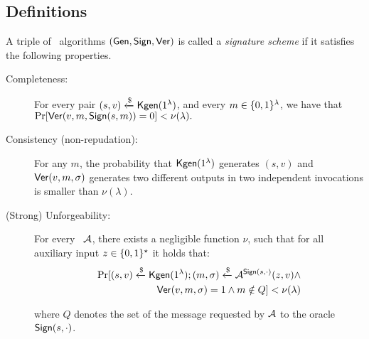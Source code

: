\subsection{Definitions}\label{se:moredefinitions}

\begin{definition}\label{def:signature} A triple of \ppt\ algorithms $(\mathsf{Gen},\mathsf{Sign},\mathsf{Ver})$
is called a {\em signature scheme} if it satisfies the following properties.

\begin{description}

\item[Completeness:] For every pair $(s,v) \xleftarrow{\text{\$}} \mathsf{Kgen}(1^\lambda)$, 
    and every $m \in \{0,1\}^{\lambda}$, we have that $\Pr[\mathsf{Ver}(v, m,\mathsf{Sign}(s, m))=0]<\nu(\lambda).$
\item[Consistency (non-repudation):] For any $m$, the probability that $\mathsf{Kgen}(1^\lambda)$ generates $(s,v)$
and $\mathsf{Ver}(v,m,\sigma)$ generates two different outputs in two independent invocations is smaller than $\nu(\lambda)$.


\item[(Strong) Unforgeability:] For every \ppt\ $\mathcal{A}$, there exists a negligible function $\nu$,  such that for all auxiliary input $z\in \{0,1\}^{\star}$ it holds that:
	\begin{equation*}\begin{split}
\Pr[(s,v) \xleftarrow{\text{\$}} \mathsf{Kgen}(1^\lambda); (m,\sigma)\xleftarrow{\text{\$}}\mathcal{A}^{\mathsf{Sign}(s,\cdot)}(z,v) \wedge \\
  \mathsf{Ver}(v,m,\sigma)=1 \wedge m \notin Q] < \nu(\lambda)
	\end{split}\end{equation*}
	
where $Q$ denotes the set of the message  requested by $\mathcal{A}$ to the oracle $\mathsf{Sign}(s,\cdot)$.
\end{description}
 \end{definition}
 
